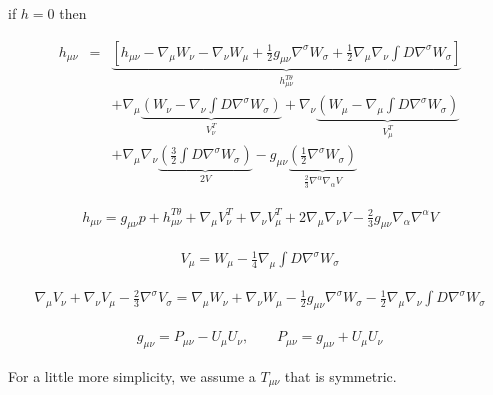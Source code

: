 \documentclass[10pt,letterpaper]{article}
\numberwithin{equation}{section}
\begin{document}
if $h=0$ then

\begin{eqnarray}
h_{\mu\nu}&=&\underbrace{ \left[ h_{\mu\nu} - \nabla_\mu W_\nu - \nabla_\nu W_\mu + \frac12 g_{\mu\nu}\nabla^\sigma W_\sigma + \frac12 \nabla_\mu \nabla_\nu \int D\nabla^\sigma W_\sigma \right] }_{h^{T\theta}_{\mu\nu}}
\nonumber\\
&& + \nabla_\mu \underbrace{\left(W_\nu - \nabla_\nu \int D \nabla^\sigma W_{\sigma}\right)}_{V_\nu^T}
		+ \nabla_\nu \underbrace{\left(W_\mu - \nabla_\mu \int D \nabla^\sigma W_{\sigma}\right)}_{V_\mu^T}
\nonumber\\
&& +\nabla_\mu \nabla_\nu \underbrace{ \left( \frac32 \int D \nabla^\sigma W_\sigma\right)}_{2V}
- g_{\mu\nu}\underbrace{\left(\frac 12 \nabla^\sigma W_\sigma\right)}_{\frac23 \nabla^\alpha \nabla_\alpha V}
\end{eqnarray}

\begin{eqnarray}
h_{\mu\nu} = g_{\mu\nu} p + h^{T\theta}_{\mu\nu} + \nabla_\mu V_\nu^T + \nabla_\nu V_\mu^T
+ 2\nabla_\mu \nabla_\nu V - \frac23 g_{\mu\nu}\nabla_\alpha \nabla^\alpha V
\end{eqnarray}

\begin{eqnarray}
V_{\mu} = W_\mu - \frac14 \nabla_\mu \int D \nabla^\sigma W_\sigma
\end{eqnarray}

\begin{eqnarray}
\nabla_\mu V_\nu + \nabla_\nu V_\mu -\frac23 \nabla^\sigma V_\sigma = \nabla_\mu W_\nu + \nabla_\nu W_\mu - \frac12 g_{\mu\nu}\nabla^\sigma W_\sigma - \frac12 \nabla_\mu \nabla_\nu \int D\nabla^\sigma W_\sigma 
\end{eqnarray}

\begin{eqnarray}
g_{\mu\nu} = P_{\mu\nu}- U_\mu U_\nu ,\qquad P_{\mu\nu} = g_{\mu\nu} + U_\mu U_\nu 
\end{eqnarray}

For a little more simplicity, we assume a $T_{\mu\nu}$ that is symmetric. 
\end{document}
